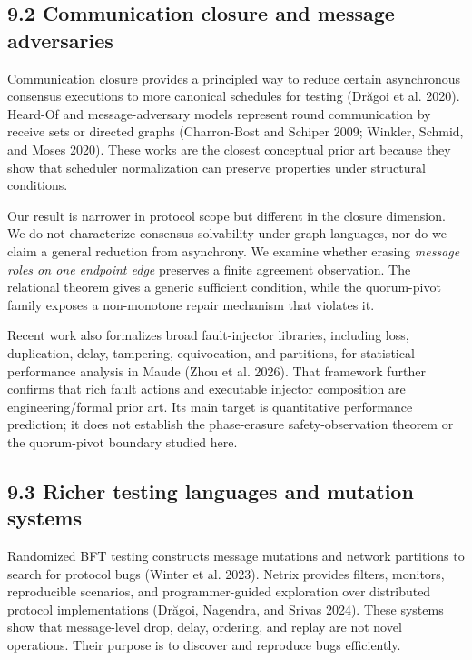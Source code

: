 \documentclass[10pt,a4paper]{article}
\begin{document}
\subsection{9.2 Communication closure and message
adversaries}\label{communication-closure-and-message-adversaries}

Communication closure provides a principled way to reduce certain
asynchronous consensus executions to more canonical schedules for
testing (Drăgoi et al. 2020). Heard-Of and message-adversary models
represent round communication by receive sets or directed graphs
(Charron-Bost and Schiper 2009; Winkler, Schmid, and Moses 2020). These
works are the closest conceptual prior art because they show that
scheduler normalization can preserve properties under structural
conditions.

Our result is narrower in protocol scope but different in the closure
dimension. We do not characterize consensus solvability under graph
languages, nor do we claim a general reduction from asynchrony. We
examine whether erasing \emph{message roles on one endpoint edge}
preserves a finite agreement observation. The relational theorem gives a
generic sufficient condition, while the quorum-pivot family exposes a
non-monotone repair mechanism that violates it.

Recent work also formalizes broad fault-injector libraries, including
loss, duplication, delay, tampering, equivocation, and partitions, for
statistical performance analysis in Maude (Zhou et al. 2026). That
framework further confirms that rich fault actions and executable
injector composition are engineering/formal prior art. Its main target
is quantitative performance prediction; it does not establish the
phase-erasure safety-observation theorem or the quorum-pivot boundary
studied here.

\subsection{9.3 Richer testing languages and mutation
systems}\label{richer-testing-languages-and-mutation-systems}

Randomized BFT testing constructs message mutations and network
partitions to search for protocol bugs (Winter et al. 2023). Netrix
provides filters, monitors, reproducible scenarios, and
programmer-guided exploration over distributed protocol implementations
(Drăgoi, Nagendra, and Srivas 2024). These systems show that
message-level drop, delay, ordering, and replay are not novel
operations. Their purpose is to discover and reproduce bugs efficiently.
\end{document}
